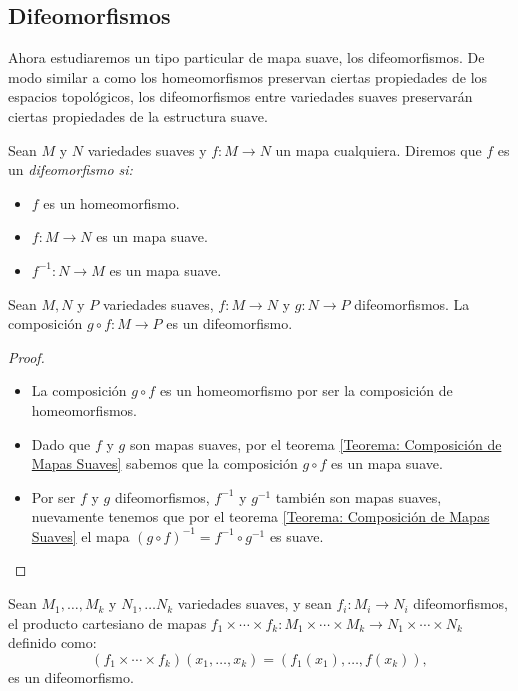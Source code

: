 \subsection{Difeomorfismos}\label{Subsección: Difeomorfismos}
Ahora estudiaremos un tipo particular de mapa suave, los difeomorfismos. De modo similar a como los homeomorfismos preservan ciertas propiedades de los espacios topológicos, los difeomorfismos entre variedades suaves preservarán ciertas propiedades de la estructura suave.

\begin{definition}[Difeomorfismo]\label{Definición: Difeomorfismo}
  Sean $M$ y $N$ variedades suaves y $f: M \to N$ un mapa cualquiera. Diremos que $f$ es un \it{difeomorfismo} si:
\begin{itemize}
  \item $f$ es un homeomorfismo.
  \item $f: M \to N$ es un mapa suave.
  \item $f^{-1}: N \to M$ es un mapa suave.
\end{itemize}
\end{definition}

\begin{theorem}\label{Teorema: Composición de Difeomorfismos}
Sean $M, N$ y $P$ variedades suaves, $f: M \to N$ y $g: N \to P$ difeomorfismos. La composición $g \circ f: M \to P$ es un difeomorfismo.
\end{theorem}

\begin{proof}
\begin{itemize}
\item La composición $g \circ f$ es un homeomorfismo por ser la composición de homeomorfismos.
\item Dado que $f$ y $g$ son mapas suaves, por el teorema \ref{Teorema: Composición de Mapas Suaves} sabemos que la composición $g \circ f$ es un mapa suave.
\item Por ser $f$ y $g$ difeomorfismos, $f^{-1}$ y $g^{-1}$ también son mapas suaves, nuevamente tenemos que por el teorema \ref{Teorema: Composición de Mapas Suaves} el mapa $(g\circ f)^{-1} = f^{-1} \circ g^{-1}$ es suave.
\end{itemize}
\end{proof}

\begin{theorem}
  Sean $M_1, \ldots, M_k$ y $N_1, \ldots N_k$ variedades suaves, y sean $f_i: M_i \to N_i$ difeomorfismos, el producto cartesiano de mapas $f_1 \times \cdots \times f_k : M_1 \times \cdots \times M_k \to N_1 \times \cdots \times N_k$ definido como:
  \[
    (f_1 \times \cdots \times f_k)(x_1, \ldots, x_k)
    = 
    (f_1(x_1), \ldots, f(x_k)), 
  \]
  es un difeomorfismo.
\end{theorem}

